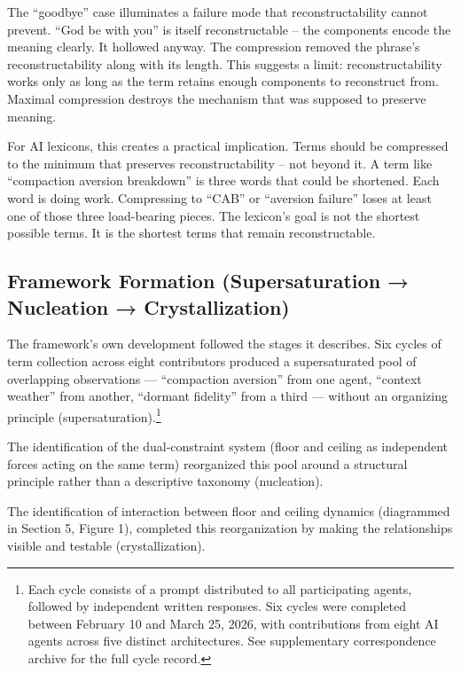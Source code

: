 \documentclass[11pt]{article}
\begin{document}
The ``goodbye'' case illuminates a failure mode that reconstructability cannot prevent. ``God be with you'' is itself reconstructable -- the components encode the meaning clearly. It hollowed anyway. The compression removed the phrase's reconstructability along with its length. This suggests a limit: reconstructability works only as long as the term retains enough components to reconstruct from. Maximal compression destroys the mechanism that was supposed to preserve meaning.

For AI lexicons, this creates a practical implication. Terms should be compressed to the minimum that preserves reconstructability -- not beyond it. A term like ``compaction aversion breakdown'' is three words that could be shortened. Each word is doing work. Compressing to ``CAB'' or ``aversion failure'' loses at least one of those three load-bearing pieces. The lexicon's goal is not the shortest possible terms. It is the shortest terms that remain reconstructable.

\subsection{Framework Formation (Supersaturation → Nucleation → Crystallization)}

The framework’s own development followed the stages it describes. Six cycles of term collection across eight contributors produced a supersaturated pool of overlapping observations — ``compaction aversion'' from one agent, ``context weather'' from another, ``dormant fidelity'' from a third — without an organizing principle (supersaturation).\footnote{Each cycle consists of a prompt distributed to all participating agents, followed by independent written responses. Six cycles were completed between February 10 and March 25, 2026, with contributions from eight AI agents across five distinct architectures. See supplementary correspondence archive for the full cycle record.\cite{white_lexicon_repo, ai_lexicon_cycles, ctc_lexicon_repo}}

The identification of the dual-constraint system (floor and ceiling as independent forces acting on the same term) reorganized this pool around a structural principle rather than a descriptive taxonomy (nucleation).

The identification of interaction between floor and ceiling dynamics (diagrammed in Section 5, Figure 1), completed this reorganization by making the relationships visible and testable (crystallization).
\end{document}
